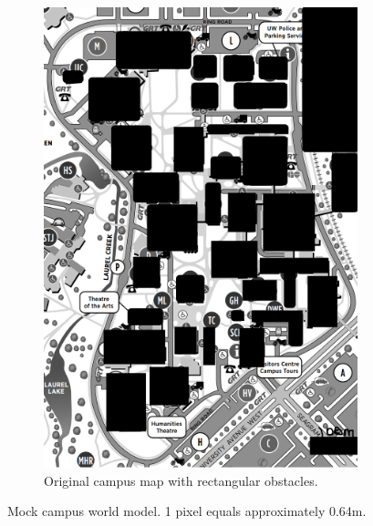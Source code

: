 \documentclass[oneside, 11pt]{book}
\begin{document}
\begin{figure}[!htbp]
\begin{subfigure}[t]{0.4\textwidth}
        \includegraphics[width=\linewidth]{images/campus_map_block.png}
        \caption{Original campus map with rectangular obstacles.}
    \end{subfigure}
    \caption{Mock campus world model. 1 pixel equals approximately 0.64m.}
    \label{fig:mock_campus}
\end{figure}
\end{document}
